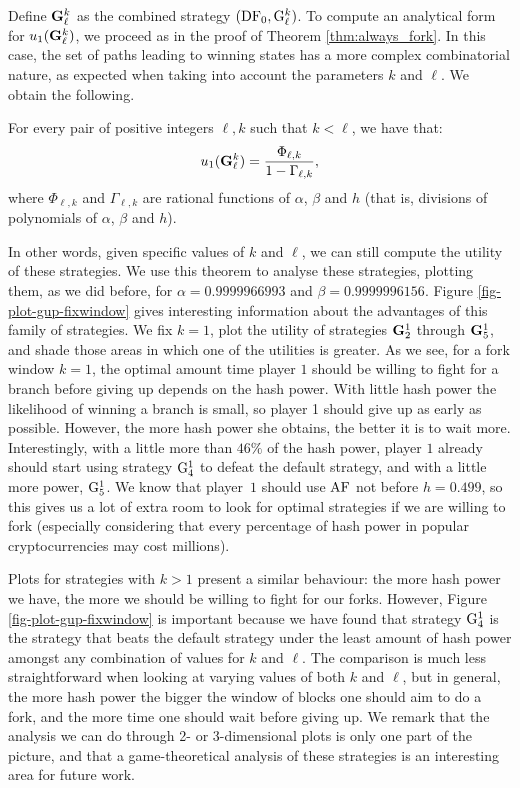 Define ${\rm {\bf G}}_\ell^k$ as the combined strategy $(\text{\rm DF}_0, {\rm {G}}_\ell^k)$. 
To compute an analytical form for $u_1({\rm {\bf G}}_\ell^k)$, we proceed as in the proof of Theorem \ref{thm:always_fork}. In this case, the set of paths leading to winning states has a more complex combinatorial nature, as expected when taking into account the 
parameters $k$ and $\ell$. We obtain the following.
\begin{theorem}
For every pair of positive integers $\ell, k$ such that $k< \ell$, we have that:
$$u_1({\rm {\bf G}}^k_\ell) = \frac{\Phi_{\ell,k}}{1-\Gamma_{\ell,k}},$$
where $\Phi_{\ell,k}$ and $\Gamma_{\ell,k}$ are rational functions of $\alpha$, $\beta$ and $h$ (that is, divisions of polynomials of  $\alpha$, $\beta$ and $h$).
\end{theorem}
In other words, given specific values of $k$ and $\ell$, we can still compute the utility of these strategies. We use this theorem to analyse these strategies, plotting them, as we did before, 
for $\alpha = 0.9999966993$ and $\beta = 0.9999996156$. Figure \ref{fig-plot-gup-fixwindow} gives 
interesting 
information about the advantages of this family of strategies. 
We fix $k = 1$, plot the utility of strategies ${\rm {\bf G}}^1_2$ through ${\rm {\bf G}}^1_5$, and shade those areas in which one of the utilities is greater. As we see, for a 
fork window $k = 1$, the optimal amount time player $1$ should be willing to fight for a branch before giving up depends on the hash power. With little hash power the likelihood of winning a 
branch is small, so player 1 should give up as early as possible. However, the more hash power she obtains, the better it is to wait more. Interestingly, with a little more than 
$46\%$ of the hash power, player $1$ already should start using strategy ${\rm {G}}^1_4$ to defeat the default strategy, and with a little more power, ${\rm {G}}^1_5$. We know that player~$1$ should use $\text{\rm AF}$ not before 
$h = 0.499$, so this gives us a lot of extra room to look for optimal strategies if we are willing to fork (especially considering that every percentage of hash power in popular cryptocurrencies 
may cost millions).

Plots for strategies with $k > 1$ present a similar behaviour: the more hash power we have, the more we should be willing to fight for our forks. However, 
Figure \ref{fig-plot-gup-fixwindow} is important because we have found that strategy ${\rm {G}}^1_4$ is the strategy that beats the default strategy under the least amount of hash power 
amongst any combination of values for $k$ and $\ell$. The comparison is much less straightforward when looking at varying values of both $k$ and $\ell$, but in general, 
the more hash power the bigger the window of blocks one should aim to do a fork, and the more time one should wait before giving up. We remark that the analysis 
we can do through 2- or 3-dimensional plots is only one part of the picture, and that a game-theoretical analysis of these strategies is an interesting area for future work. 


